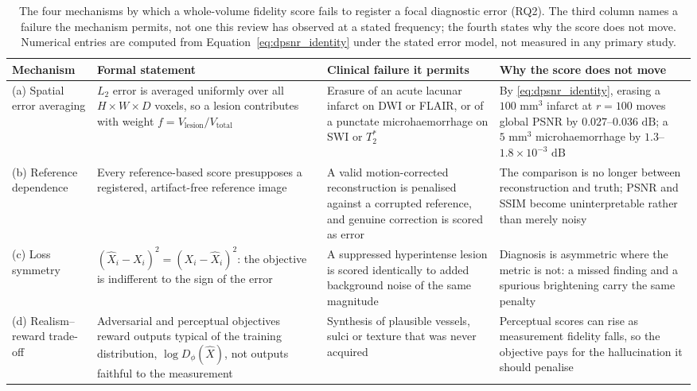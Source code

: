 \documentclass[review,authoryear]{elsarticle}
\begin{document}
\begin{table}[t]
\centering
\caption{The four mechanisms by which a whole-volume fidelity score fails to register a
focal diagnostic error (RQ2). The third column names a failure the mechanism permits,
not one this review has observed at a stated frequency; the fourth states why the score
does not move. Numerical entries are computed from
Equation~\eqref{eq:dpsnr_identity} under the stated error model, not measured in any
primary study.}
\label{tab:mechanisms}
\footnotesize
\setlength{\tabcolsep}{2pt}
\renewcommand{\arraystretch}{1.18}
\begin{tabular}{>{\raggedright\arraybackslash}p{} >{\raggedright\arraybackslash}p{} >{\raggedright\arraybackslash}p{} >{\raggedright\arraybackslash}p{}}
\hline
\textbf{Mechanism} & \textbf{Formal statement} & \textbf{Clinical failure it permits} & \textbf{Why the score does not move} \\
\hline
(a) Spatial error averaging &
$L_2$ error is averaged uniformly over all $H\times W\times D$ voxels, so a lesion
contributes with weight $f = V_{\text{lesion}}/V_{\text{total}}$ &
Erasure of an acute lacunar infarct on DWI or FLAIR, or of a punctate microhaemorrhage
on SWI or $T_2^{*}$ &
By \eqref{eq:dpsnr_identity}, erasing a $100\text{ mm}^3$ infarct at $r=100$ moves global
PSNR by $0.027$--$0.036\text{ dB}$; a $5\text{ mm}^3$ microhaemorrhage by
$1.3$--$1.8\times10^{-3}\text{ dB}$ \\
\hline
(b) Reference dependence &
Every reference-based score presupposes a registered, artifact-free reference image &
A valid motion-corrected reconstruction is penalised against a corrupted reference, and
genuine correction is scored as error &
The comparison is no longer between reconstruction and truth; PSNR and SSIM become
uninterpretable rather than merely noisy \\
\hline
(c) Loss symmetry &
$(\hat{X}_i - X_i)^2 = (X_i - \hat{X}_i)^2$: the objective is indifferent to the sign of
the error &
A suppressed hyperintense lesion is scored identically to added background noise of the
same magnitude &
Diagnosis is asymmetric where the metric is not: a missed finding and a spurious
brightening carry the same penalty \\
\hline
(d) Realism--reward trade-off &
Adversarial and perceptual objectives reward outputs typical of the training
distribution, $\log D_\phi(\hat{X})$, not outputs faithful to the measurement &
Synthesis of plausible vessels, sulci or texture that was never acquired &
Perceptual scores can rise as measurement fidelity falls, so the objective pays for the
hallucination it should penalise \\
\hline
\end{tabular}
\end{table}
\end{document}
